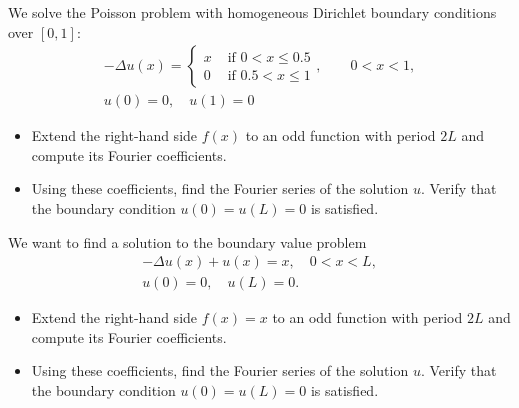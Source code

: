 \documentclass[11pt]{article}
\begin{document}
\begin{exercise}
    We solve the Poisson problem with homogeneous Dirichlet boundary conditions over $[0,1]$:
    \begin{gather*}
        - \Delta u(x) = \left\{\begin{array}{ll} x & \text{ if } 0 < x \leq 0.5 \\ 0 & \text{ if } 0.5 < x \leq 1 \end{array}\right., \qquad 0 < x < 1,
        \\
        u(0) = 0, \quad u(1) = 0
    \end{gather*}
    \begin{itemize}
        \item Extend the right-hand side $f(x)$ to an odd function with period $2L$ and compute its Fourier coefficients.
        \item Using these coefficients, find the Fourier series of the solution $u$. Verify that the boundary condition $u(0) = u(L) = 0$ is satisfied.
    \end{itemize}
\end{exercise}
\begin{solution}     
\end{solution}

\begin{exercise}
    We want to find a solution to the boundary value problem 
    \begin{gather*}
        - \Delta u(x) + u(x) = x, \quad 0 < x < L,
        \\
        u(0) = 0, \quad u(L) = 0.
    \end{gather*}
    \begin{itemize}
        \item Extend the right-hand side $f(x) = x$ to an odd function with period $2L$ and compute its Fourier coefficients.
        \item Using these coefficients, find the Fourier series of the solution $u$. Verify that the boundary condition $u(0) = u(L) = 0$ is satisfied.
    \end{itemize}
\end{exercise}
\begin{solution}     
\end{solution}
\end{document}
